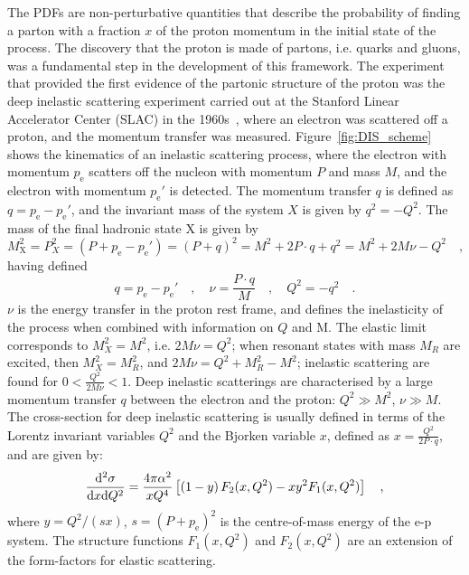 The PDFs are non-perturbative quantities that describe the probability of finding a parton with a fraction $x$ of the proton momentum in the initial state of the process. The discovery that the proton is made of partons, i.e. quarks and gluons, was a fundamental step in the development of this framework. The experiment that provided the first evidence of the partonic structure of the proton was the deep inelastic scattering experiment carried out at the Stanford Linear Accelerator Center (SLAC) in the 1960s~\cite{Friedman:1972sy}, where an electron was scattered off a proton, and the momentum transfer was measured. Figure~\ref{fig:DIS_scheme} shows the kinematics of an inelastic scattering process, where the electron with momentum $p_\mathrm{e}$ scatters off the nucleon with momentum $P$ and mass $M$, and the electron with momentum $p_\mathrm{e}'$ is detected. The momentum transfer $q$ is defined as $q = p_\mathrm{e} - p_\mathrm{e}'$, and the invariant mass of the system $X$ is given by $q^2 = -Q^2$. The mass of the final hadronic state X is given by 
\begin{equation*}
    M_\mathrm{X}^2 = P_X^2 = (P+p_\mathrm{e} - p_\mathrm{e}') = (P+q)^2 = M^2 + 2P\cdot q + q^2 = M^2 + 2M\nu -Q^2\quad ,
\end{equation*}
having defined
\begin{equation*}
    q=p_\mathrm{e}-p_\mathrm{e}'\quad , \quad \nu = \frac{P\cdot q}{M}\quad , \quad Q^2 = -q^2\quad .
\end{equation*}
$\nu$ is the energy transfer in the proton rest frame, and defines the inelasticity of the process when combined with information on $Q$ and M. The elastic limit corresponds to $M_X^2 = M^2$, i.e. $2M\nu = Q^2$; when resonant states with mass $M_R$ are excited, then $M_X^2 = M_R^2$, and $2M\nu = Q^2 + M_R^2 - M^2$; inelastic scattering are found for $0<\frac{Q^2}{2M\nu}<1$. Deep inelastic scatterings are characterised by a large momentum transfer $q$ between the electron and the proton: $Q^2\gg M^2$, $\nu\gg M$. The cross-section for deep inelastic scattering is usually defined in terms of the Lorentz invariant variables $Q^2$ and the Bjorken variable $x$, defined as $x = \frac{Q^2}{2P\cdot q}$, and are given by:
\begin{equation*}
    \frac{\mathrm{d}^2\sigma}{\mathrm{d} x \mathrm{d} Q^2} = \frac{4\pi\alpha^2}{xQ^4} \left[ \left(1-y\right)F_2(x,Q^2) - xy^2F_1(x,Q^2) \right]\quad ,
\end{equation*}
where $y=Q^2/(sx)$, $s = (P+p_\mathrm{e})^2$ is the centre-of-mass energy of the e-p system. The structure functions $F_1(x,Q^2)$ and $F_2(x,Q^2)$ are an extension of the form-factors for elastic scattering.
